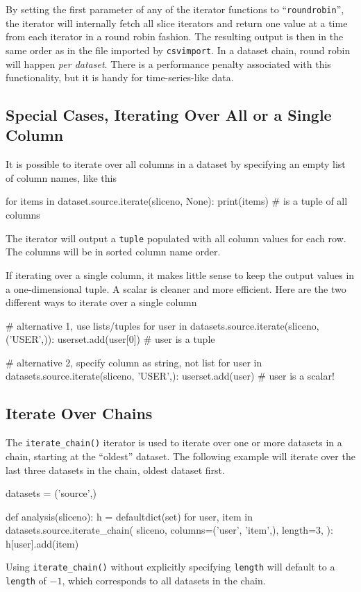 By setting the first parameter of any of the iterator functions to
``\texttt{roundrobin}'', the iterator will internally fetch all slice
iterators and return one value at a time from each iterator in a round
robin fashion.  The resulting output is then in the same order as in
the file imported by \texttt{csvimport}.  In a dataset chain, round
robin will happen \textsl{per dataset}.  There is a performance
penalty associated with this functionality, but it is handy for
time-series-like data.



\subsection{Special Cases, Iterating Over All or a Single Column}
It is possible to iterate over all columns in a dataset by specifying
an empty list of column names, like this
\begin{python}
for items in dataset.source.iterate(sliceno, None):
    print(items)  # is a tuple of all columns
\end{python}
The iterator will output a \texttt{tuple} populated with all column
values for each row.  The columns will be in sorted column name order.

If iterating over a single column, it makes little sense to keep the
output values in a one-dimensional tuple.  A scalar is cleaner and
more efficient.  Here are the two different ways to iterate over a
single column
\begin{python}
# alternative 1, use lists/tuples
for user in datasets.source.iterate(sliceno, ('USER',)):
    userset.add(user[0])  # user is a tuple

# alternative 2, specify column as string, not list
for user in datasets.source.iterate(sliceno, 'USER',):
    userset.add(user)     # user is a scalar!
\end{python}



\subsection{Iterate Over Chains}
The \texttt{iterate\_chain()} iterator is used to iterate over one or
more datasets in a chain, starting at the ``oldest'' dataset.  The
following example will iterate over the last three datasets in the
chain, oldest dataset first.
\begin{python}
datasets = ('source',)

def analysis(sliceno):
    h = defaultdict(set)
    for user, item in datasets.source.iterate_chain(
        sliceno, columns=('user', 'item',), length=3,
    ):
        h[user].add(item)
\end{python}
Using \texttt{iterate\_chain()} without explicitly specifying
\texttt{length} will default to a \texttt{length} of $-1$, which
corresponds to all datasets in the chain.

